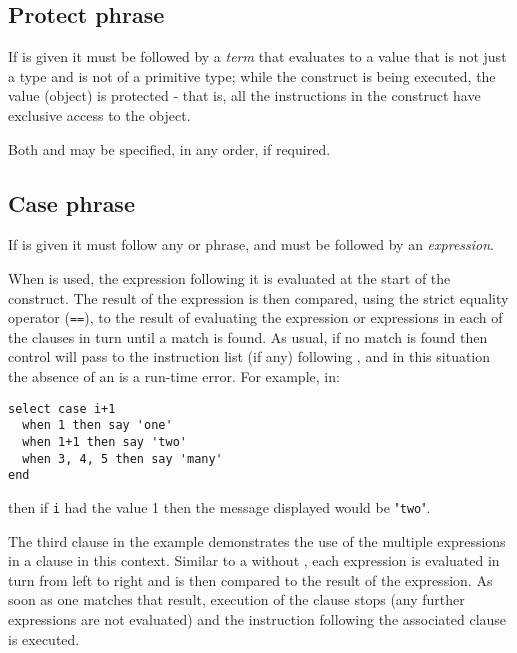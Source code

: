 \subsection{Protect phrase}
 
If  is given it must be followed by a \emph{term}
that evaluates to a value that is not just a type and is not of a
primitive type;
while the  construct is being executed, the value
(object) is protected - that is, all the instructions in the
 construct have exclusive access to the object.
 
Both  and  may be specified, in any order,
if required.
\subsection{Case phrase}
 
If  is given it must follow any  or
 phrase, and must be followed by an
\emph{expression}.
 
When  is used, the expression following it is evaluated at
the start of the  construct.
The result of the expression is then compared, using the strict equality
operator (\texttt{==}), to the result of evaluating the expression
or expressions in each of the  clauses in turn until
a match is found.  As usual, if no match is found then control
will pass to the instruction list (if any) following
, and in this situation the absence of an
 is a run-time error.
 For example, in:
\begin{lstlisting}
select case i+1
  when 1 then say 'one'
  when 1+1 then say 'two'
  when 3, 4, 5 then say 'many'
end
\end{lstlisting}
then if \texttt{i} had the value 1 then the message displayed would be
"\texttt{two}".
 
The third  clause in the example demonstrates the use of the
multiple expressions in a  clause in this context.
Similar to a  without , each
expression is evaluated in turn from left to right and is then
compared to the result of the  expression.
As soon as one matches that result, execution of the
 clause stops (any further expressions are not
evaluated) and the instruction following the associated
 clause is executed.

